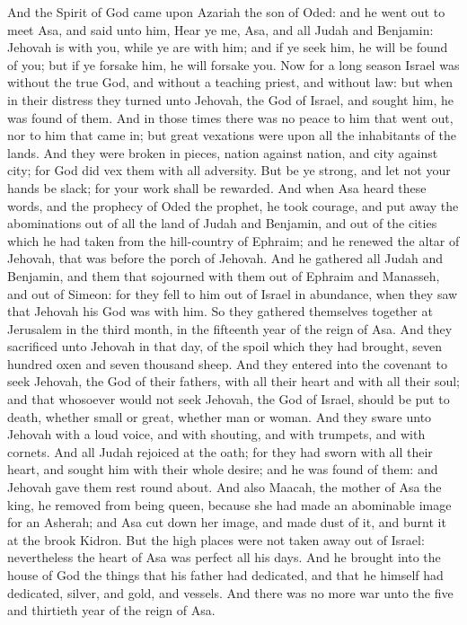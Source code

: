 And the Spirit of God came upon Azariah the son of Oded: and he went out to meet Asa, and said unto him, Hear ye me, Asa, and all Judah and Benjamin: Jehovah is with you, while ye are with him; and if ye seek him, he will be found of you; but if ye forsake him, he will forsake you. Now for a long season Israel was without the true God, and without a teaching priest, and without law: but when in their distress they turned unto Jehovah, the God of Israel, and sought him, he was found of them. And in those times there was no peace to him that went out, nor to him that came in; but great vexations were upon all the inhabitants of the lands. And they were broken in pieces, nation against nation, and city against city; for God did vex them with all adversity. But be ye strong, and let not your hands be slack; for your work shall be rewarded.  And when Asa heard these words, and the prophecy of Oded the prophet, he took courage, and put away the abominations out of all the land of Judah and Benjamin, and out of the cities which he had taken from the hill-country of Ephraim; and he renewed the altar of Jehovah, that was before the porch of Jehovah. And he gathered all Judah and Benjamin, and them that sojourned with them out of Ephraim and Manasseh, and out of Simeon: for they fell to him out of Israel in abundance, when they saw that Jehovah his God was with him. So they gathered themselves together at Jerusalem in the third month, in the fifteenth year of the reign of Asa. And they sacrificed unto Jehovah in that day, of the spoil which they had brought, seven hundred oxen and seven thousand sheep. And they entered into the covenant to seek Jehovah, the God of their fathers, with all their heart and with all their soul; and that whosoever would not seek Jehovah, the God of Israel, should be put to death, whether small or great, whether man or woman. And they sware unto Jehovah with a loud voice, and with shouting, and with trumpets, and with cornets. And all Judah rejoiced at the oath; for they had sworn with all their heart, and sought him with their whole desire; and he was found of them: and Jehovah gave them rest round about.  And also Maacah, the mother of Asa the king, he removed from being queen, because she had made an abominable image for an Asherah; and Asa cut down her image, and made dust of it, and burnt it at the brook Kidron. But the high places were not taken away out of Israel: nevertheless the heart of Asa was perfect all his days. And he brought into the house of God the things that his father had dedicated, and that he himself had dedicated, silver, and gold, and vessels. And there was no more war unto the five and thirtieth year of the reign of Asa. 

